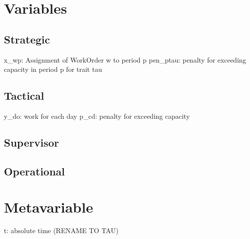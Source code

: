 \section{Variables}
\subsection{Strategic}
x_{wp}: Assignment of WorkOrder w to period p
pen_{ptau}: penalty for exceeding capacity in period p for trait tau


\subsection{Tactical}
y_{do}: work for each day
p_{cd}: penalty for exceeding capacity
\subsection{Supervisor}
\subsection{Operational}

\section{Metavariable}
t: absolute time (RENAME TO TAU)


